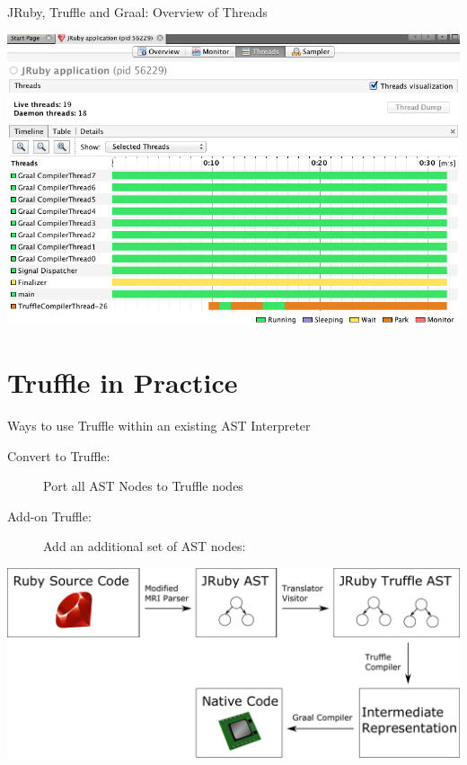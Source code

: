 \documentclass[xcolor=dvipsname,handout]{beamer} %
\begin{document}
\begin{frame}{JRuby, Truffle and Graal: Overview of Threads}
\begin{table}
    \centering
    \includegraphics[width=1.0\textwidth]{visualvm.png}
\end{table}
\end{frame}

\section{Truffle in Practice}

\begin{frame}{Ways to use Truffle within an existing AST Interpreter}

\begin{description}
 \item[Convert to Truffle:] Port all AST Nodes to Truffle nodes
 \item[Add-on Truffle:] Add an additional set of AST nodes:
\end{description}
\begin{table}
  \centering
  \includegraphics[width=1.0\textwidth]{graaltruffle.pdf}
\end{table}
\end{frame}
\end{document}
